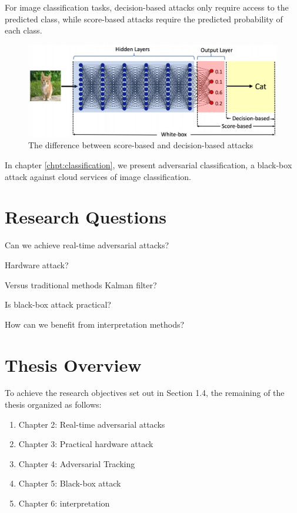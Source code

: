 For image classification tasks, decision-based attacks only require access to the predicted class, while score-based attacks require the predicted probability of each class.

\begin{figure}[H]
\centering
\includegraphics[scale=0.35]{figures/chapter_intro/score-decision.jpg}
\caption{The difference between score-based and decision-based attacks \citep{chen2020hopskipjumpattack}}
\label{fig.decision}
\end{figure}

In chapter \ref{chpt:classification}, we present adversarial classification, a black-box attack against cloud services of image classification.

\section{Research Questions}
\label{sec:research_question}

Can we achieve real-time adversarial attacks?

Hardware attack?

Versus traditional methods Kalman filter?

Is black-box attack practical?

How can we benefit from interpretation methods?

\section{Thesis Overview}

To achieve the research objectives set out in Section 1.4, the remaining of the thesis organized as follows:

\begin{enumerate}
    \item Chapter 2: Real-time adversarial attacks
    \item Chapter 3: Practical hardware attack
    \item Chapter 4: Adversarial Tracking
    \item Chapter 5: Black-box attack
    \item Chapter 6: interpretation
\end{enumerate}